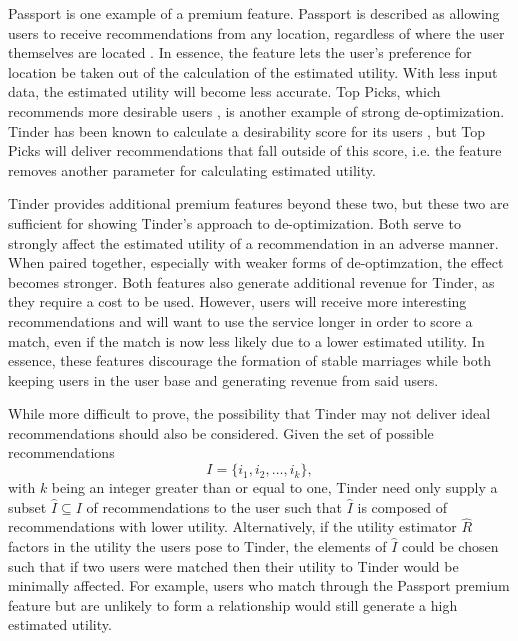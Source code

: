 Passport is one example of a premium feature. Passport is described as allowing users to receive recommendations from any location, regardless of where the user themselves are located \citep{TinderPassport}. In essence, the feature lets the user's preference for location be taken out of the calculation of the estimated utility. With less input data, the estimated utility will become less accurate. Top Picks, which recommends more desirable users \citep{TinderTopPicks}, is another example of strong de-optimization. Tinder has been known to calculate a desirability score for its users \citep{Tiffany2019}, but Top Picks will deliver recommendations that fall outside of this score, i.e. the feature removes another parameter for calculating estimated utility. 

Tinder provides additional premium features beyond these two, but these two are sufficient for showing Tinder's approach to de-optimization. Both serve to strongly affect the estimated utility of a recommendation in an adverse manner. When paired together, especially with weaker forms of de-optimzation, the effect becomes stronger. Both features also generate additional revenue for Tinder, as they require a cost to be used. However, users will receive more interesting recommendations and will want to use the service longer in order to score a match, even if the match is now less likely due to a lower estimated utility. In essence, these features discourage the formation of stable marriages while both keeping users in the user base and generating revenue from said users.

While more difficult to prove, the possibility that Tinder may not deliver ideal recommendations should also be considered. Given the set of possible recommendations 
\begin{equation*}
    I = \{i_{1}, i_{2}, \ldots , i_{k}\},
\end{equation*}
with $k$ being an integer greater than or equal to one, Tinder need only supply a subset $\hat{I} \subseteq I$ of recommendations to the user such that $\hat{I}$ is composed of recommendations with lower utility. Alternatively, if the utility estimator $\hat{R}$ factors in the utility the users pose to Tinder, the elements of $\hat{I}$ could be chosen such that if two users were matched then their utility to Tinder would be minimally affected. For example, users who match through the Passport premium feature but are unlikely to form a relationship would still generate a high estimated utility.

